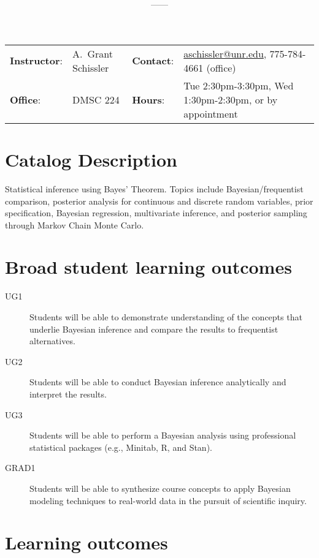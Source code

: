 \documentclass[11pt,onecolumn]{article}
\title{\textbf{\coursename}}
\author{{\semester}---{\roomnumb}---{\classtimes}}
\date{}
\makeatletter
\newcommand{\myname}{A.~Grant Schissler}
\newcommand{\myemail}{aschissler@unr.edu}
\newcommand{\office}{DMSC 224}
\newcommand{\officehours}{Tue 2:30pm-3:30pm, Wed 1:30pm-2:30pm, or by appointment}
\makeatother
\begin{document}
\maketitle

\vspace{-0.25in}
\noindent\makebox[\linewidth]{\rule{\textwidth}{1pt}}

\begin{center}
\begin{tabular}{llll}
\textbf{Instructor}:&\myname & \textbf{Contact}:&\href{mailto:\myemail}{\myemail}, 775-784-4661 (office)\\
\textbf{Office}:&\office & \textbf{Hours}:&\officehours\\
\end{tabular}
\end{center}

\section*{Catalog Description}
Statistical inference using Bayes’ Theorem. Topics include Bayesian/frequentist comparison, posterior analysis for continuous and discrete random variables, prior specification, Bayesian regression, multivariate inference, and posterior sampling through Markov Chain Monte Carlo.

\section*{Broad student learning outcomes}

\begin{description}
\item[UG1] Students will be able to demonstrate understanding of the concepts that underlie Bayesian inference and compare the results to frequentist alternatives.
\item[UG2] Students will be able to conduct Bayesian inference analytically and interpret the results.
\item[UG3] Students will be able to perform a Bayesian analysis using professional statistical packages (e.g., \textsf{Minitab}, \textsf{R}, and \textsf{Stan}).
\item[GRAD1] Students will be able to synthesize course concepts to apply Bayesian modeling techniques to real-world data in the pursuit of scientific inquiry.
\end{description}

\section*{Learning outcomes}
\end{document}
